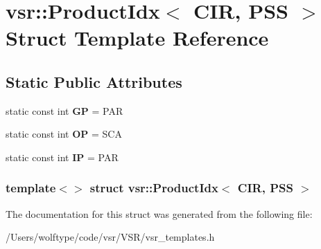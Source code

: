 \hypertarget{structvsr_1_1_product_idx_3_01_c_i_r_00_01_p_s_s_01_4}{\section{vsr\-:\-:Product\-Idx$<$ C\-I\-R, P\-S\-S $>$ Struct Template Reference}
\label{structvsr_1_1_product_idx_3_01_c_i_r_00_01_p_s_s_01_4}
}
\subsection*{Static Public Attributes}
\begin{DoxyCompactItemize}
\item 
\hypertarget{structvsr_1_1_product_idx_3_01_c_i_r_00_01_p_s_s_01_4_a9acbb5115925df69f947928d56f33db4}{static const int {\bfseries G\-P} = P\-A\-R}\label{structvsr_1_1_product_idx_3_01_c_i_r_00_01_p_s_s_01_4_a9acbb5115925df69f947928d56f33db4}

\item 
\hypertarget{structvsr_1_1_product_idx_3_01_c_i_r_00_01_p_s_s_01_4_a97bce66e36f065bd7d5c471046d55bf7}{static const int {\bfseries O\-P} = S\-C\-A}\label{structvsr_1_1_product_idx_3_01_c_i_r_00_01_p_s_s_01_4_a97bce66e36f065bd7d5c471046d55bf7}

\item 
\hypertarget{structvsr_1_1_product_idx_3_01_c_i_r_00_01_p_s_s_01_4_aa7bfc2e937344db47ca795fb1847300d}{static const int {\bfseries I\-P} = P\-A\-R}\label{structvsr_1_1_product_idx_3_01_c_i_r_00_01_p_s_s_01_4_aa7bfc2e937344db47ca795fb1847300d}

\end{DoxyCompactItemize}
\subsubsection*{template$<$$>$ struct vsr\-::\-Product\-Idx$<$ C\-I\-R, P\-S\-S $>$}



The documentation for this struct was generated from the following file\-:\begin{DoxyCompactItemize}
\item 
/\-Users/wolftype/code/vsr/\-V\-S\-R/vsr\-\_\-templates.\-h\end{DoxyCompactItemize}
